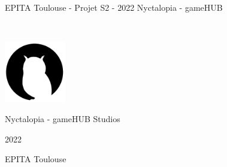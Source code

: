 \vfill
\noindent\makebox[\linewidth]{\rule{.8\paperwidth}{.6pt}}\\[0.2cm]
EPITA Toulouse - Projet S2 - 2022 \hfill Nyctalopia - gameHUB
\noindent\makebox[\linewidth]{\rule{.8\paperwidth}{.6pt}}

\newpage

\thispagestyle{empty}
~
\vfill
\begin{center}
\includegraphics[width=0.2\textwidth]{img/logos/logo.png}

\large Nyctalopia - gameHUB Studios

\large 2022

\large EPITA Toulouse
\end{center}